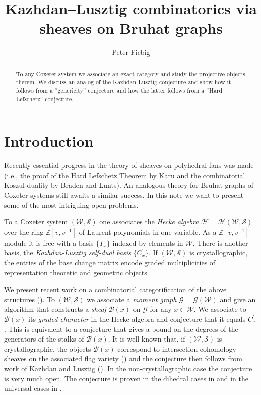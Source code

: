 \documentclass[12pt]{amsart}
\theoremstyle{definition}
\theoremstyle{remark}
\newcommand{\CG}{{\mathcal G}}
\newcommand{\CH}{{\mathcal H}}
\newcommand{\CS}{{\mathcal S}}
\newcommand{\CW}{{\mathcal W}}
\newcommand{\SB}{{\mathscr B}}
\newcommand{\DZ}{{\mathbb Z}}
\begin{document}
\title{Kazhdan--Lusztig combinatorics via sheaves on Bruhat graphs}

\author{Peter Fiebig}
\address{Mathematisches Institut, Universit{\"a}t Freiburg, 79104 Freiburg, Germany}





\begin{abstract}
 To any Coxeter system we associate an exact category and  study the projective objects therein. We discuss an analog of the Kazhdan-Lusztig conjecture and show how it follows from a ``genericity'' conjecture and how the latter follows from a ``Hard Lefschetz'' conjecture.
\end{abstract}

\maketitle

\section{Introduction}
Recently essential progress in the theory of sheaves on polyhedral fans was made (i.e., the proof of the Hard Lefschetz Theorem by Karu and the combinatorial Koszul duality by Braden and Lunts). An analogous theory for Bruhat graphs of Coxeter systems still awaits a similar success. In this note we want to present some of the most intriguing open problems. 

 To a Coxeter system $(\CW,\CS)$ one  associates the {\em Hecke algebra} $\CH=\CH(\CW,\CS)$ over the ring $\DZ[v,v^{-1}]$ of Laurent polynomials in one variable. As a $\DZ[v,v^{-1}]$-module it is free with a basis $\{T_x\}$ indexed by elements in $\CW$. There is another basis, the  {\em Kazhdan-Lusztig self-dual basis} $\{C_x^\prime\}$. If $(\CW,\CS)$ is crystallographic, the  entries of the base change matrix encode graded multiplicities of representation theoretic and geometric objects. 

We present recent work on a combinatorial categorification of the above structures (\cite{Soe3, Fie2}). To $(\CW,\CS)$ we associate a {\em moment graph} $\CG=\CG(\CW)$ and give an algorithm that constructs a {\em sheaf} $\SB(x)$ on $\CG$ for any $x\in\CW$. We associate to $\SB(x)$ its {\em graded character} in the Hecke algebra and conjecture that it equals $C_x^\prime$.  This is equivalent to a conjecture that gives a bound on the degrees of the generators of the stalks of $\SB(x)$. It is well-known that, if $(\CW,\CS)$ is crystallographic,  the objects $\SB(x)$ correspond to intersection cohomology sheaves on the associated flag variety (\cite{Soe1, BMP}) and the conjecture then follows from work of Kazhdan and Lusztig (\cite{KL2}). In the non-crystallographic case the conjecture is very much open. The conjecture is proven in the dihedral cases in \cite{Soe3} and in the universal cases in \cite{Fie2}. 
\end{document}
